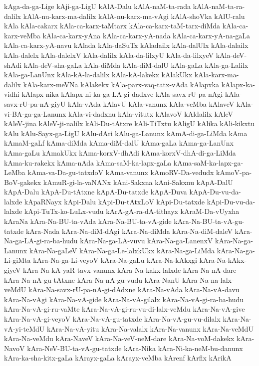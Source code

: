 {kAga-da-ga-Lige
kAji-ga-LigU
kAlA-Dalu
kAlA-naM-ta-rada
kAlA-naM-ta-ra-dalilx
kAlA-nu-karx-ma-dalilx
kAlA-nu-karx-ma-vAgi
kAlA-shoVka
kAlU-ralu
kAla
kAla-cakarx
kAla-ca-karx-taMtarx
kAla-ca-karx-taM-tarx-diMda
kAla-ca-karx-veMba
kAla-ca-karx-yAna
kAla-ca-karx-yA-nada
kAla-ca-karx-yA-na-gaLa
kAla-ca-karx-yA-navu
kAlada
kAla-daSuTx
kAladailx
kAla-dalUlx
kAla-dalailx
kAla-dalelx
kAla-dalelxV
kAla-dalilx
kAla-da-lilxyU
kAla-da-lilxyeV
kAla-deV-shAdi
kAla-deV-sha-gaLa
kAla-diMda
kAla-diM-dalU
kAla-gaLa
kAla-ga-Lalilx
kAla-ga-LanUnx
kAla-kA-la-dalilx
kAla-kA-lakekx
kAlakUkx
kAla-karx-ma-dalilx
kAla-karx-meVNa
kAlakekx
kAla-parx-vaq-tatx-vAda
kAlapxka
kAlapx-ka-vidhi
kAlapx-nika
kAlapx-ni-ka-ga-LA-gi-dadxve
kAla-savx-rU-pa-nAgi
kAla-savx-rU-pa-nA-giyU
kAla-vAda
kAlavU
kAla-vanunx
kAla-veMba
kAlaveV
kAla-vi-BA-ga-ga-Lanunx
kAla-vi-dadxnu
kAla-vitutx
kAlavoV
kAldalilx
kAleV
kAleV-jina
kAleV-ji-nalilx
kAli-Du-tAtxre
kAli-TiTxtu
kAligU
kAlika
kAli-kikxtu
kAlu
kAlu-Sayx-ga-LigU
kAlu-dAri
kAlu-ga-Lanunx
kAmA-di-ga-LiMda
kAma
kAmaM-gaLf
kAma-diMda
kAma-diM-dalU
kAma-gaLa
kAma-ga-LanUnx
kAma-gaLu
kAmakUkx
kAma-korxV-dhAdi
kAma-korxV-dhA-di-ga-LiMda
kAma-ku-rakekx
kAma-nAda
kAma-saM-ka-lapx-gaLa
kAma-saM-ka-lapx-ga-LeMba
kAma-va-Da-gu-tatxdoV
kAma-vanunx
kAmoRV-Da-vedudx
kAmoV-pa-BoV-gakekx
kAmuR-gi-la-vaNANx
kAni-Sakxna
kAni-Sakxnu
kApA-DalU
kApA-Dalu
kApA-Du-tAtxne
kApA-Du-tatxde
kApA-Duva
kApA-Du-vu-da-lalxde
kApaRNayx
kApi-Dalu
kApi-Du-tAtxLoV
kApi-Du-tatxde
kApi-Du-vu-da-lalxde
kApi-TuTx-ko-LuLx-vudu
kArA-gA-ra-dA-tithayx
kAraM-Da-vUyxha
kAraNa
kAra-Na-BU-ta-vAda
kAra-Na-BU-ta-vA-gide
kAra-Na-BU-ta-vA-gu-tatxde
kAra-Nada
kAra-Na-diM-dAgi
kAra-Na-diMda
kAra-Na-diM-daleV
kAra-Na-ga-LA-gi-ra-ba-hudu
kAra-Na-ga-LA-vuvu
kAra-Na-ga-LanenxV
kAra-Na-ga-Lanunx
kAra-Na-gaLeV
kAra-Na-ga-Le-lalxkUkx
kAra-Na-ga-LiMda
kAra-Na-ga-Li-giMta
kAra-Na-ga-Li-veyoV
kAra-Na-gaLu
kAra-Na-kAkxgi
kAra-Na-kAkx-giyeV
kAra-Na-kA-yaR-tavx-vanunx
kAra-Na-kakx-lalxde
kAra-Na-nA-dare
kAra-Na-nA-gu-tAtxne
kAra-Na-nA-gu-vudu
kAra-NanU
kAra-Na-na-lalx-veMdU
kAra-Na-savx-rU-pa-nA-gi-dAdxne
kAra-Na-vAda
kAra-Na-vA-davu
kAra-Na-vAgi
kAra-Na-vA-gide
kAra-Na-vA-gilalx
kAra-Na-vA-gi-ra-ba-hudu
kAra-Na-vA-gi-ru-vaMte
kAra-Na-vA-gi-ru-vu-di-lalx-veMdu
kAra-Na-vA-give
kAra-Na-vA-gi-veyoV
kAra-Na-vA-gu-tatxde
kAra-Na-vA-gu-vu-dilalx
kAra-Na-vA-yi-teMdU
kAra-Na-vA-yitu
kAra-Na-valalx
kAra-Na-vanunx
kAra-Na-veMdU
kAra-Na-veMdu
kAra-NaveV
kAra-Na-veV-neM-dare
kAra-Na-voM-dakekx
kAra-NavoV
kAra-NeV-BU-ta-vA-gu-tatxde
kAra-Nika
kAra-Ni-ka-neM-bu-danunx
kAra-ka-sha-kitx-gaLa
kArayx-gaLa
kArayx-veMba
kArenf
kArflx
kArikA
}
